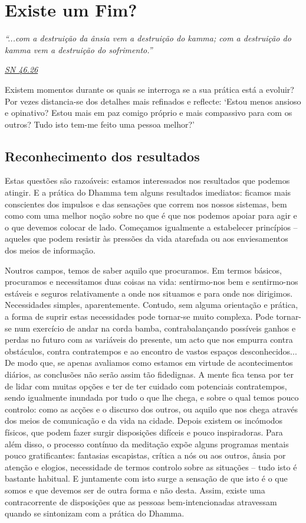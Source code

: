 \chapter{Existe um Fim?}

\emph{``...com a destruição da ânsia vem a destruição do kamma; com a destruição do kamma vem a destruição do sofrimento.''}

\href{https://suttacentral.net/sn46.26/en/bodhi}{\emph{SN 46.26}}

Existem momentos durante os quais se interroga se a sua prática está a evoluir? Por vezes distancia-se dos detalhes mais refinados e reflecte: `Estou menos ansioso e opinativo? Estou mais em paz comigo próprio e mais compassivo para com os outros? Tudo isto tem-me feito uma pessoa melhor?'

\section{Reconhecimento dos resultados}

Estas questões são razoáveis: estamos interessados nos resultados que podemos atingir. E a prática do Dhamma tem alguns resultados imediatos: ficamos mais conscientes dos impulsos e das sensações que correm nos nossos sistemas, bem como com uma melhor noção sobre no que é que nos podemos apoiar para agir e o que devemos colocar de lado. Começamos igualmente a estabelecer princípios -- aqueles que podem resistir às pressões da vida atarefada ou aos enviesamentos dos meios de informação.

Noutros campos, temos de saber aquilo que procuramos. Em termos básicos, procuramos e necessitamos duas coisas na vida: sentirmo-nos bem e sentirmo-nos estáveis e seguros relativamente a onde nos situamos e para onde nos dirigimos. Necessidades simples, aparentemente. Contudo, sem alguma orientação e prática, a forma de suprir estas necessidades pode tornar-se muito complexa. Pode tornar-se num exercício de andar na corda bamba, contrabalançando possíveis ganhos e perdas no futuro com as variáveis do presente, um acto que nos empurra contra obstáculos, contra contratempos e ao encontro de vastos espaços desconhecidos... De modo que, se apenas avaliamos como estamos em virtude de acontecimentos diários, as conclusões não serão assim tão fidedignas. A mente fica tensa por ter de lidar com muitas opções e ter de ter cuidado com potenciais contratempos, sendo igualmente inundada por tudo o que lhe chega, e sobre o qual temos pouco controlo: como as acções e o discurso dos outros, ou aquilo que nos chega através dos meios de comunicação e da vida na cidade. Depois existem os incómodos físicos, que podem fazer surgir disposições difíceis e pouco inspiradoras. Para além disso, o processo contínuo da meditação expõe alguns programas mentais pouco gratificantes: fantasias escapistas, crítica a nós ou aos outros, ânsia por atenção e elogios, necessidade de termos controlo sobre as situações -- tudo isto é bastante habitual. E juntamente com isto surge a sensação de que isto é o que somos e que devemos ser de outra forma e não desta. Assim, existe uma contracorrente de disposições que as pessoas bem-intencionadas atravessam quando se sintonizam com a prática do Dhamma.

